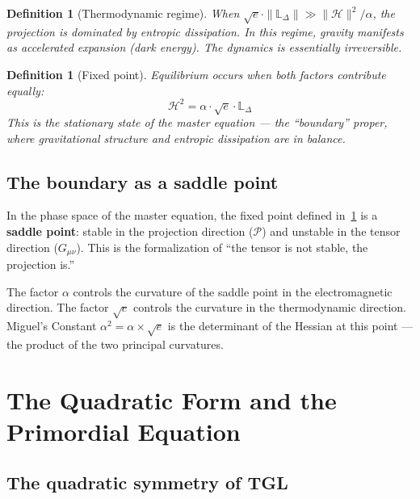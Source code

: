 \documentclass[12pt,a4paper,twoside]{article}
\newtheorem{definition}[theorem]{Definition}
\newcommand{\alphaii}{\alpha^{2}}
\begin{document}
\begin{definition}[Thermodynamic regime]
When $\sqrt{e} \cdot \|\mathbb{L}_\Delta\| \gg \|\mathcal{H}\|^2/\alpha$, the projection is dominated by entropic dissipation. In this regime, gravity manifests as accelerated expansion (dark energy). The dynamics is essentially irreversible.
\end{definition}

\begin{definition}[Fixed point]
\label{def:ponto_fixo}
Equilibrium occurs when both factors contribute equally:
\begin{equation}
\mathcal{H}^2 = \alpha \cdot \sqrt{e} \cdot \mathbb{L}_\Delta
\end{equation}
This is the stationary state of the master equation --- the ``boundary'' proper, where gravitational structure and entropic dissipation are in balance.
\end{definition}


\subsection{The boundary as a saddle point}

In the phase space of the master equation, the fixed point defined in~\ref{def:ponto_fixo} is a \textbf{saddle point}: stable in the projection direction ($\mathcal{P}$) and unstable in the tensor direction ($G_{\mu\nu}$). This is the formalization of ``the tensor is not stable, the projection is.''

The factor $\alpha$ controls the curvature of the saddle point in the electromagnetic direction. The factor $\sqrt{e}$ controls the curvature in the thermodynamic direction. Miguel's Constant $\alphaii = \alpha \times \sqrt{e}$ is the determinant of the Hessian at this point --- the product of the two principal curvatures.



\section{The Quadratic Form and the Primordial Equation}
\label{sec:quadratica}

\subsection{The quadratic symmetry of TGL}
\end{document}
